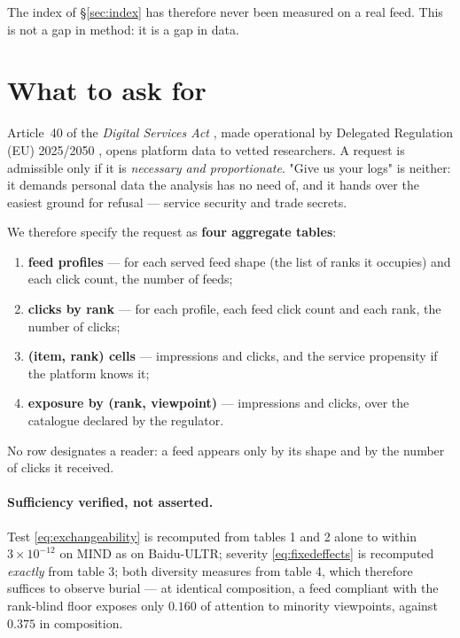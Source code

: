\documentclass[11pt,a4paper]{article}
\begin{document}
The index of \S\ref{sec:index} has therefore never been measured on a real feed. This is not a
gap in method: it is a gap in data.

\section{What to ask for}
\label{sec:request}

Article~40 of the \emph{Digital Services Act} \citep{dsa2022}, made operational by Delegated
Regulation (EU) 2025/2050 \citep{delegue2025}, opens platform data to vetted researchers. A
request is admissible only if it is \emph{necessary and proportionate}. "Give us your logs" is
neither: it demands personal data the analysis has no need of, and it hands over the easiest
ground for refusal --- service security and trade secrets.

We therefore specify the request as \textbf{four aggregate tables}:

\begin{enumerate}
\item \textbf{feed profiles} --- for each served feed shape (the list of ranks it occupies) and
      each click count, the number of feeds;
\item \textbf{clicks by rank} --- for each profile, each feed click count and each rank, the
      number of clicks;
\item \textbf{(item, rank) cells} --- impressions and clicks, and the service propensity if the
      platform knows it;
\item \textbf{exposure by (rank, viewpoint)} --- impressions and clicks, over the catalogue
      declared by the regulator.
\end{enumerate}

No row designates a reader: a feed appears only by its shape and by the number of clicks it
received.

\paragraph{Sufficiency verified, not asserted.} Test \eqref{eq:exchangeability} is recomputed
from tables 1 and 2 alone to within $3 \times 10^{-12}$ on MIND as on Baidu-ULTR; severity
\eqref{eq:fixedeffects} is recomputed \emph{exactly} from table 3; both diversity measures from
table 4, which therefore suffices to observe burial --- at identical composition, a feed
compliant with the rank-blind floor exposes only $0.160$ of attention to minority viewpoints,
against $0.375$ in composition.
\end{document}
